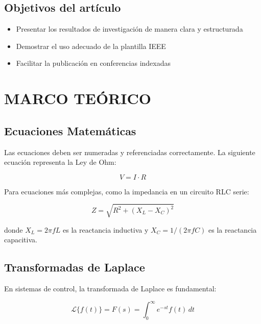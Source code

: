 \documentclass[conference, letterpaper, 10pt]{IEEEtran}
\begin{document}
\subsection{Objetivos del artículo}
\begin{itemize}
    \item Presentar los resultados de investigación de manera clara y estructurada
    \item Demostrar el uso adecuado de la plantilla IEEE
    \item Facilitar la publicación en conferencias indexadas
\end{itemize}

\section{MARCO TEÓRICO}

\subsection{Ecuaciones Matemáticas}
Las ecuaciones deben ser numeradas y referenciadas correctamente. La siguiente ecuación representa la Ley de Ohm:

\begin{equation}
    V = I \cdot R
    \label{eq:ohm}
\end{equation}

Para ecuaciones más complejas, como la impedancia en un circuito RLC serie:

\begin{equation}
    Z = \sqrt{R^2 + \left(X_L - X_C\right)^2}
    \label{eq:impedancia}
\end{equation}

donde $X_L = 2\pi f L$ es la reactancia inductiva y $X_C = 1/(2\pi f C)$ es la reactancia capacitiva.

\subsection{Transformadas de Laplace}
En sistemas de control, la transformada de Laplace es fundamental:

\begin{equation}
    \mathcal{L}\{f(t)\} = F(s) = \int_0^\infty e^{-st} f(t) \, dt
    \label{eq:laplace}
\end{equation}

\end{document}
